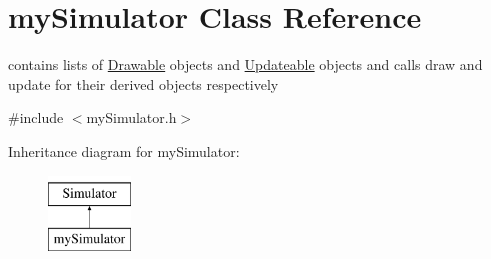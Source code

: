 \hypertarget{classmy_simulator}{}\section{my\+Simulator Class Reference}
\label{classmy_simulator}


contains lists of \mbox{\hyperlink{class_drawable}{Drawable}} objects and \mbox{\hyperlink{class_updateable}{Updateable}} objects and calls draw and update for their derived objects respectively  




{\ttfamily \#include $<$my\+Simulator.\+h$>$}

Inheritance diagram for my\+Simulator\+:\begin{figure}[H]
\begin{center}
\leavevmode
\includegraphics[height=2.000000cm]{da/de4/classmy_simulator}
\end{center}
\end{figure}
